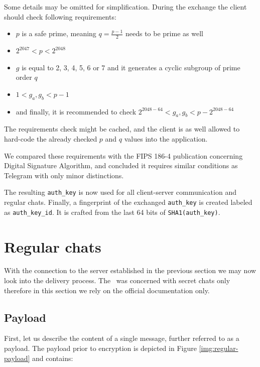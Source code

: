 \documentclass[thesis=M,english]{FITthesis}[2012/10/20]
\begin{document}
Some details may be omitted for simplification. During the exchange the client should check following requirements:\label{crypto-prime-req}

\begin{itemize}
	\item $p$ is a safe prime, meaning $q = \frac{p-1}{2}$ needs to be prime as well
	\item $2^{2047} < p < 2^{2048}$
	\item $g$ is equal to 2, 3, 4, 5, 6 or 7 and it generates a cyclic subgroup of prime order $q$
	\item $1 < g_a, g_b < p-1$
	\item and finally, it is recommended to check $2^{2048-64} < g_a, g_b < p - 2^{2048-64}$
\end{itemize}

The requirements check might be cached, and the client is as well allowed to hard-code the already checked $p$ and $q$ values into the application.

We compared these requirements with the FIPS 186-4 publication concerning Digital Signature Algorithm, and concluded it requires similar conditions as Telegram with only minor distinctions.

The resulting \texttt{auth\_key} is now used for all client-server communication and regular chats. Finally, a fingerprint of the exchanged \texttt{auth\_key} is created labeled as \texttt{auth\_key\_id}. It is crafted from the last 64 bits of \texttt{SHA1(auth\_key)}.



\section{Regular chats}\label{crypto-regular}

With the connection to the server established in the previous section we may now look into the delivery process. The~\cite{telegram-aarhus} was concerned with secret chats only therefore in this section we rely on the official documentation only.


\subsection{Payload}\label{crypto-regular-payload}

First, let us describe the content of a single message, further referred to as a payload. The payload prior to encryption is depicted in Figure \ref{img:regular-payload} and contains:
\end{document}
